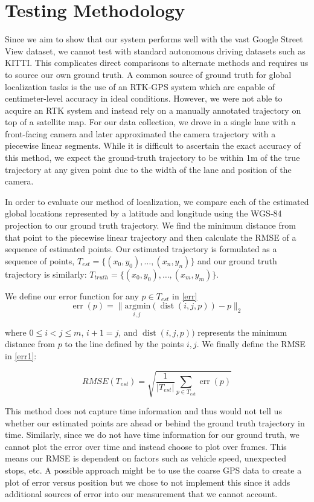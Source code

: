 \documentclass[conference]{IEEEtran}
\begin{document}
\section{Testing Methodology}
Since we aim to show that our system performs well with the vast Google Street View dataset, we cannot test with standard autonomous driving datasets such as KITTI. This complicates direct comparisons to alternate methods and requires us to source our own ground truth. A common source of ground truth for global localization tasks is the use of an RTK-GPS system which are capable of centimeter-level accuracy in ideal conditions. However, we were not able to acquire an RTK system and instead rely on a manually annotated trajectory on top of a satellite map. For our data collection, we drove in a single lane with a front-facing camera and later approximated the camera trajectory with a piecewise linear segments. While it is difficult to ascertain the exact accuracy of this method, we expect the ground-truth trajectory to be within 1m of the true trajectory at any given point due to the width of the lane and position of the camera.

In order to evaluate our method of localization, we compare each of the estimated global locations represented by a latitude and longitude using the WGS-84 projection to our ground truth trajectory. We find the minimum distance from that point to the piecewise linear trajectory and then calculate the RMSE of a sequence of estimated points. Our estimated trajectory is formulated as a sequence of points, $T_{est}=\{(x_0, y_0), \dots, (x_n, y_n)\}$ and our ground truth trajectory is similarly: $T_{truth}=\{(x_0, y_0), \dots, (x_m, y_m)\}$. 

We define our error function for any $p\in T_{est}$ in \eqref{err} 
\begin{equation}
\operatorname{err}(p)=\|\underset{i,j\;}{\mathrm{argmin}}(\operatorname{dist}(i,j,p))-p\|_2 
\label{err}
\end{equation}

where $0 \leq i < j \leq m$, $i + 1 = j$, and $\operatorname{dist}(i,j,p))$ represents the minimum distance from $p$ to the line defined by the points $i, j$. We finally define the RMSE in \eqref{err1}:

\begin{equation}
RMSE(T_{est})=\sqrt{\frac{1}{|T_{est}|}\sum\limits_{p \in T_{est}} \operatorname{err}(p)}
\label{err1}
\end{equation}

This method does not capture time information and thus would not tell us whether our estimated points are ahead or behind the ground truth trajectory in time. Similarly, since we do not have time information for our ground truth, we cannot plot the error over time and instead choose to plot over frames. This means our RMSE is dependent on factors such as vehicle speed, unexpected stops, etc. A possible approach might be to use the coarse GPS data to create a plot of error versus position but we chose to not implement this since it adds additional sources of error into our measurement that we cannot account.
\end{document}
